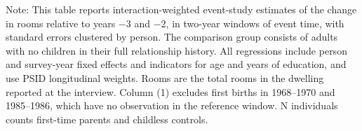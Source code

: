 \begin{table}[p]
\begin{minipage}{0.97\linewidth}
\smallskip
Note: This table reports interaction-weighted event-study estimates
\citep{sunAbrahamDynamicEffects2021} of the change in rooms relative to
years $-3$ and $-2$, in two-year windows of event time, with standard errors
clustered by person. The comparison group consists of adults with no children
in their full relationship history. All regressions include person and
survey-year fixed effects and indicators for age and years of education, and
use PSID longitudinal weights. Rooms are the total rooms in the dwelling
reported at the interview. Column (1) excludes first births in 1968--1970 and
1985--1986, which have no observation in the reference window. N individuals
counts first-time parents and childless controls.
\end{minipage}
\end{table}

